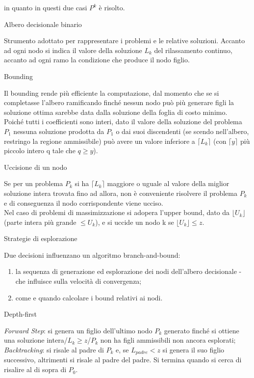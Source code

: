 \documentclass[answers, a4paper, 11pt]{exam}
\begin{document}
\begin{questions}
\begin{solution}
in quanto in questi due casi $P^{k}$ è risolto. 
\end{solution}
\question Albero decisionale binario
\begin{solution}
Strumento adottato per rappresentare i problemi e le relative soluzioni. Accanto ad ogni nodo si indica il valore della soluzione $L_{k}$ del rilassamento continuo, accanto ad ogni ramo la condizione che produce il nodo figlio.
\end{solution}
\question Bounding
\begin{solution}
Il bounding rende più efficiente la computazione, dal momento che se si completasse l'albero ramificando finché nessun nodo può più generare figli la soluzione ottima sarebbe data dalla soluzione della foglia di costo minimo.\\
Poiché tutti i coefficienti sono interi, dato il valore della soluzione del problema $P_{1}$ nessuna soluzione prodotta da $P_{1}$ o dai suoi discendenti (se scendo nell'albero, restringo la regione ammissibile) può avere un valore inferiore a $\lceil L_{k} \rceil$ (con $\lceil y \rceil$ più piccolo intero q tale che $q \ge y$).
\end{solution}
\question Uccisione di un nodo
\begin{solution}
Se per un problema $P_{k}$ si ha $\lceil L_{k} \rceil$ maggiore o uguale al valore della miglior soluzione intera trovata fino ad allora, non è conveniente risolvere il problema $P_{k}$ e di conseguenza il nodo corrispondente viene ucciso.\\
Nel caso di problemi di massimizzazione si adopera l'upper bound, dato da $\lfloor U_{k} \rfloor$ (parte intera più grande $\le U_{k}$), e si uccide un nodo k se $\lfloor U_{k} \rfloor \le z$.
\end{solution}
\question Strategie di esplorazione
\begin{solution}
Due decisioni influenzano un algoritmo branch-and-bound:
\begin{enumerate}
\item la sequenza di generazione ed esplorazione dei nodi dell'albero decisionale - che influisce sulla velocità di convergenza;
\item come e quando calcolare i bound relativi ai nodi.
\end{enumerate}
\end{solution}
\question Depth-first
\begin{solution}
\emph{Forward Step}: si genera un figlio dell'ultimo nodo $P_{k}$ generato finché si ottiene una soluzione intera/$L_{k}\ge z$/$P_{k}$ non ha figli ammissibili non ancora esplorati; \emph{Backtracking}: si risale al padre di $P_{k}$ e, se $L_{padre} < z$ si genera il suo figlio successivo, altrimenti si risale al padre del padre. Si termina quando si cerca di risalire al di sopra di $P_{0}$.\\

\end{solution}
\end{questions}
\end{document}

